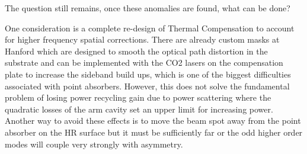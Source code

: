	 \indent The question still remains, once these anomalies are found, what can be done?
	 
	 One consideration is a complete re-design of Thermal Compensation to account for higher frequency spatial corrections. There are already custom masks at Hanford which are designed to smooth the optical path distortion in the substrate and can be implemented with the CO2 lasers on the compensation plate to increase the sideband build ups, which is one of the biggest difficulties associated with point absorbers.  However, this does not solve the fundamental problem of losing power recycling gain due to power scattering where the quadratic losses of the arm cavity set an upper limit for increasing power.  Another way to avoid these effects is to move the beam spot away from the point absorber on the HR surface but it must be sufficiently far or the odd higher order modes will couple very strongly with asymmetry. 
	 
